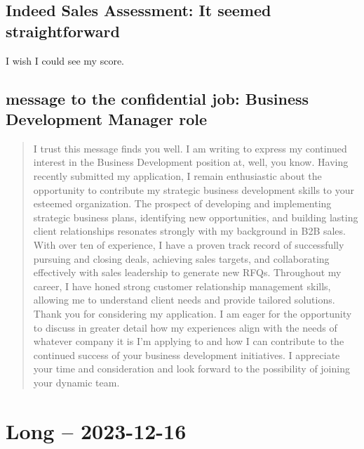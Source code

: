 \documentclass[
	letterpaper, %
	12pt, %
]{CSSullivanBusinessReport}
\begin{document}

\subsection[Indeed Sales Assessment]{Indeed Sales Assessment: It seemed straightforward}

I wish I could see my score.


\subsection[message to the confidential job]{message to the confidential job: Business Development Manager role}

\begin{quote}

	I trust this message finds you well. I am writing to express my continued interest in the Business Development position at, well, you know. Having recently submitted my application, I remain enthusiastic about the opportunity to contribute my strategic business development skills to your esteemed organization. The prospect of developing and implementing strategic business plans, identifying new opportunities, and building lasting client relationships resonates strongly with my background in B2B sales. With over ten of experience, I have a proven track record of successfully pursuing and closing deals, achieving sales targets, and collaborating effectively with sales leadership to generate new RFQs. Throughout my career, I have honed strong customer relationship management skills, allowing me to understand client needs and provide tailored solutions. Thank you for considering my application. I am eager for the opportunity to discuss in greater detail how my experiences align with the needs of whatever company it is I'm applying to and how I can contribute to the continued success of your business development initiatives. I appreciate your time and consideration and look forward to the possibility of joining your dynamic team.

\end{quote}


\section[16 Dec: Short]{Long -- 2023-12-16} %
\end{document}
